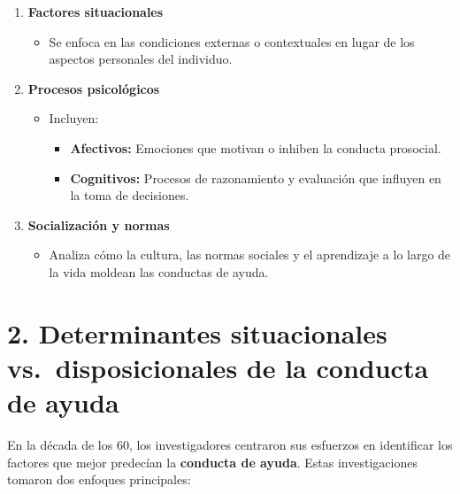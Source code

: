 \documentclass[
]{book}
\providecommand{\tightlist}{%
  \setlength{\itemsep}{0pt}\setlength{\parskip}{0pt}}
\begin{document}
\begin{enumerate}
\def\labelenumi{\arabic{enumi}.}
\tightlist
\item
  \textbf{Factores situacionales}

  \begin{itemize}
  \tightlist
  \item
    Se enfoca en las condiciones externas o contextuales en lugar de los aspectos personales del individuo.
  \end{itemize}
\item
  \textbf{Procesos psicológicos}

  \begin{itemize}
  \tightlist
  \item
    Incluyen:

    \begin{itemize}
    \tightlist
    \item
      \textbf{Afectivos:} Emociones que motivan o inhiben la conducta prosocial.
    \item
      \textbf{Cognitivos:} Procesos de razonamiento y evaluación que influyen en la toma de decisiones.
    \end{itemize}
  \end{itemize}
\item
  \textbf{Socialización y normas}

  \begin{itemize}
  \tightlist
  \item
    Analiza cómo la cultura, las normas sociales y el aprendizaje a lo largo de la vida moldean las conductas de ayuda.
  \end{itemize}
\end{enumerate}

\chapter{2. Determinantes situacionales vs.~disposicionales de la conducta de ayuda}\label{determinantes-situacionales-vs.-disposicionales-de-la-conducta-de-ayuda}

En la década de los 60, los investigadores centraron sus esfuerzos en identificar los factores que mejor predecían la \textbf{conducta de ayuda}. Estas investigaciones tomaron dos enfoques principales:
\end{document}
